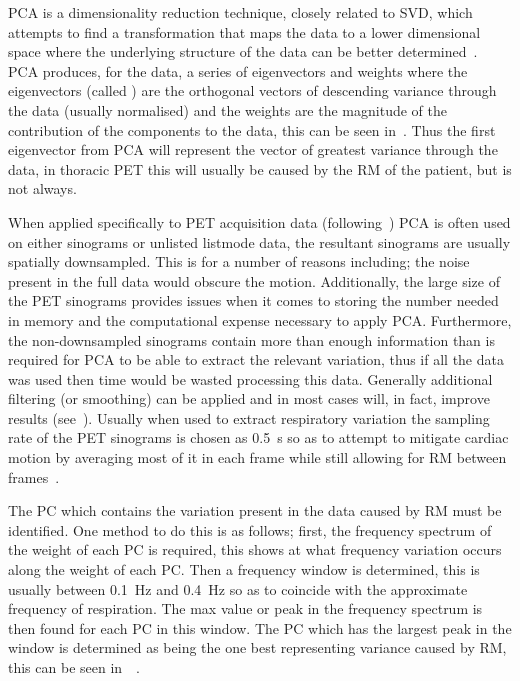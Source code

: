                 \gls{PCA} is a dimensionality reduction technique, closely related to \gls{SVD}, which attempts to find a transformation that maps the data to a lower dimensional space where the underlying structure of the data can be better determined~. \gls{PCA} produces, for the data, a series of eigenvectors and weights where the eigenvectors (called ) are the orthogonal vectors of descending variance through the data (usually normalised) and the weights are the magnitude of the contribution of the components to the data, this can be seen in~. Thus the first eigenvector from \gls{PCA} will represent the vector of greatest variance through the data, in thoracic \gls{PET} this will usually be caused by the \gls{RM} of the patient, but is not always.
                
                When applied specifically to \gls{PET} acquisition data (following~) \gls{PCA} is often used on either sinograms or unlisted listmode data, the resultant sinograms are usually spatially downsampled. This is for a number of reasons including; the noise present in the full data would obscure the motion. Additionally, the large size of the \gls{PET} sinograms provides issues when it comes to storing the number needed in memory and the computational expense necessary to apply \gls{PCA}. Furthermore, the non-downsampled sinograms contain more than enough information than is required for \gls{PCA} to be able to extract the relevant variation, thus if all the data was used then time would be wasted processing this data. Generally additional filtering (or smoothing) can be applied and in most cases will, in fact, improve results (see~). Usually when used to extract respiratory variation the sampling rate of the \gls{PET} sinograms is chosen as \SI{0.5}{\second} so as to attempt to mitigate cardiac motion by averaging most of it in each frame while still allowing for \gls{RM} between frames~.
                
                The \gls{PC} which contains the variation present in the data caused by \gls{RM} must be identified. One method to do this is as follows; first, the frequency spectrum of the weight of each \gls{PC} is required, this shows at what frequency variation occurs along the weight of each \gls{PC}. Then a frequency window is determined, this is usually between \SI{0.1}{\hertz} and \SI{0.4}{\hertz} so as to coincide with the approximate frequency of respiration. The max value or peak in the frequency spectrum is then found for each \gls{PC} in this window. The \gls{PC} which has the largest peak in the window is determined as being the one best representing variance caused by \gls{RM}, this can be seen in~~.
                
